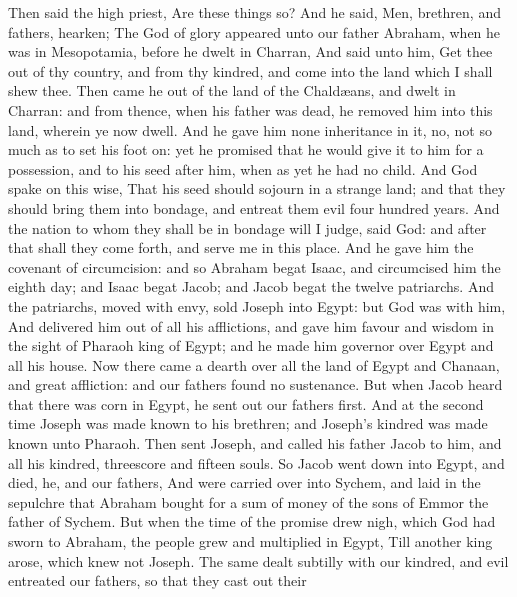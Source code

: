 Then said the high priest, Are these things so?
 And he said, Men, brethren, and fathers, hearken; The God
of glory appeared unto our father Abraham, when he was in Mesopotamia,
before he dwelt in Charran,  And said unto him, Get thee
out of thy country, and from thy kindred, and come into the land which I
shall shew thee.  Then came he out of the land of the
Chaldæans, and dwelt in Charran: and from thence, when his father was
dead, he removed him into this land, wherein ye now dwell.
 And he gave him none inheritance in it, no, not so much
as to set his foot on: yet he promised that he would give it to him for
a possession, and to his seed after him, when as yet he had no child.
 And God spake on this wise, That his seed should sojourn
in a strange land; and that they should bring them into bondage, and
entreat them evil four hundred years.  And the nation to
whom they shall be in bondage will I judge, said God: and after that
shall they come forth, and serve me in this place.  And he
gave him the covenant of circumcision: and so Abraham begat Isaac, and
circumcised him the eighth day; and Isaac begat Jacob; and Jacob begat
the twelve patriarchs.  And the patriarchs, moved with
envy, sold Joseph into Egypt: but God was with him,  And
delivered him out of all his afflictions, and gave him favour and wisdom
in the sight of Pharaoh king of Egypt; and he made him governor over
Egypt and all his house.  Now there came a dearth over
all the land of Egypt and Chanaan, and great affliction: and our fathers
found no sustenance.  But when Jacob heard that there was
corn in Egypt, he sent out our fathers first.  And at the
second time Joseph was made known to his brethren; and Joseph's kindred
was made known unto Pharaoh.  Then sent Joseph, and
called his father Jacob to him, and all his kindred, threescore and
fifteen souls.  So Jacob went down into Egypt, and died,
he, and our fathers,  And were carried over into Sychem,
and laid in the sepulchre that Abraham bought for a sum of money of the
sons of Emmor the father of Sychem.  But when the time of
the promise drew nigh, which God had sworn to Abraham, the people grew
and multiplied in Egypt,  Till another king arose, which
knew not Joseph.  The same dealt subtilly with our
kindred, and evil entreated our fathers, so that they cast out their
